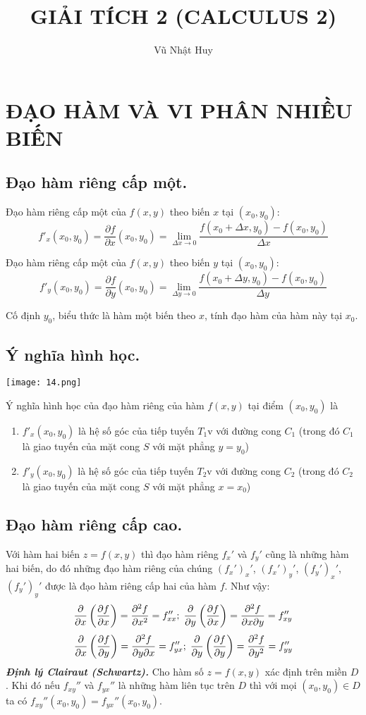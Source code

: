 \documentclass[12pt, a4paper]{report}
\title{GIẢI TÍCH 2 (CALCULUS 2)}
\author{Vũ Nhật Huy}
\begin{document}
\maketitle
\newpage
\chapter*{ĐẠO HÀM VÀ VI PHÂN NHIỀU BIẾN}
\section{Đạo hàm riêng cấp một.}
Đạo hàm riêng cấp một của $f(x,y)$ theo biến $x$ tại $(x_0,y_0)$: 
\[
    f'_{x}(x_0,y_0)= \frac{\partial f}{\partial x}(x_0,y_0)=\displaystyle\lim_{\Delta x \to 0} \dfrac{f(x_0 + \Delta x,y_0) - f(x_0,y_0)}{\Delta x}  
\]

Đạo hàm riêng cấp một của $f(x,y)$ theo biến $y$ tại $(x_0,y_0)$: 
\[
    f'_{y}(x_0,y_0)= \frac{\partial f}{\partial y}(x_0,y_0)=\displaystyle\lim_{\Delta y \to 0} \dfrac{f(x_0 + \Delta y,y_0) - f(x_0,y_0)}{\Delta y}  
\]

Cố định $y_0$, biểu thức là hàm một biến theo $x$, tính đạo hàm của hàm này tại $x_0$.
\section{Ý nghĩa hình học.}
\begin{center}
    \texttt{[image: 14.png]}
\end{center}
Ý nghĩa hình học của đạo hàm riêng của hàm $f(x,y)$ tại điểm $(x_0,y_0)$ là
\begin{enumerate}
    \item $f'_x(x_0,y_0)$ là hệ số góc của tiếp tuyến $T_1$v với đường cong $C_1$ (trong đó $C_1$ là giao tuyến của mặt cong $S$ với mặt phẳng $y=y_0$)
    \item $f'_y(x_0,y_0)$ là hệ số góc của tiếp tuyến $T_2$v với đường cong $C_2$ (trong đó $C_2$ là giao tuyến của mặt cong $S$ với mặt phẳng $x=x_0$)
\end{enumerate}
\section{Đạo hàm riêng cấp cao.}
Với hàm hai biến $z =f(x,y)$ thì đạo hàm riêng $f_{x}'$ và $f_{y}'$ cũng là những hàm hai biến, do đó những đạo hàm riêng của chúng $(f_{x}')_{x}'$, $(f_{x}')_{y}'$, $(f_{y}')_{x}'$, $(f_{y}')_{y}'$ được là đạo hàm riêng cấp hai của hàm $f$. Như vậy:
\[
  \frac{\partial}{\partial x}\left( \frac{\partial f}{\partial x}\right) = \frac{\partial^2 f}{\partial x^2} = f_{xx}''; \thickspace \frac{\partial}{\partial y}\left( \frac{\partial f}{\partial x}\right) = \frac{\partial^2 f}{\partial x \partial y} = f_{xy}''
\]
\[
  \frac{\partial}{\partial x}\left( \frac{\partial f}{\partial y}\right) = \frac{\partial^2 f}{\partial y \partial x} = f_{yx}''; \thickspace \frac{\partial}{\partial y}\left( \frac{\partial f}{\partial y}\right) = \frac{\partial^2 f}{\partial y^2} = f_{yy}''    
\]
\textbf{\textit{Định lý Clairaut (Schwartz).}} Cho hàm số $z =f(x,y)$ xác định trên miền $D$. Khi đó  nếu $f_{xy}''$ và $f_{yx}''$ là những hàm liên tục trên $D$ thì với mọi $(x_0,y_0) \in D$ ta có $f_{xy}'' (x_0,y_0) = f_{yx}'' (x_0,y_0)$.
\end{document}
